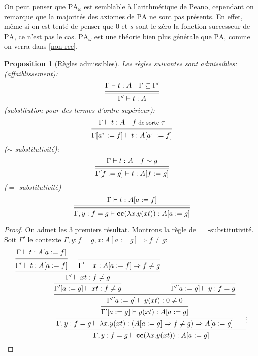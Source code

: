 \documentclass[a4paper,12pt]{article}
\newtheorem{prop}[theo]{Proposition}
\theoremstyle{rmqstyle}
\newcommand{\PA}{\mathrm{PA}}
\renewcommand{\implies}{\Rightarrow}
\newcommand{\cc}{\mathbf{cc}}
\begin{document}
On peut penser que $\PA_\omega$ est semblable à l'arithmétique de Peano, cependant on remarque que la majorités des axiomes de $\PA$ ne sont pas présents. En effet, même si on est tenté de penser que $0$ et $s$ sont le zéro la fonction successeur de $\PA$, ce n'est pas le cas. $\PA_\omega$ est une théorie bien plus générale que $\PA$, comme on verra dans \ref{non rec}. 

\begin{prop}[Règles admissibles]
Les règles suivantes sont admissibles:\\
(affaiblissement):
$$ 
\begin{prooftree}[center=false]
\hypo{\Gamma \vdash t : A \quad \Gamma \subseteq \Gamma'}
\infer[double]1{\Gamma' \vdash t : A}
\end{prooftree}
$$
(substitution pour des termes d'ordre supérieur):
$$
\begin{prooftree}[center=false]
\hypo{\Gamma \vdash t : A \quad {\footnotesize f \text{ de sorte } \tau}}
\infer[double]1{\Gamma[a^\tau := f] \vdash t : A[a^\tau := f]}
\end{prooftree}
$$
($\sim$-substitutivité):
$$
\begin{prooftree}[center=false]
\hypo{\Gamma \vdash t : A \quad f \sim g}
\infer[double]1{\Gamma[f := g] \vdash t : A[f := g]}
\end{prooftree}
$$
($=$-substitutivité)
$$
\begin{prooftree}[center=false]
\hypo{\Gamma \vdash t : A[a := f]}
\infer[double]1{\Gamma, y : f = g \vdash \cc(\lambda x. y(xt)) : A[a := g]}
\end{prooftree}
$$
\end{prop}

\begin{proof} 
On admet les 3 premiers résultat. Montrons la règle de $=$-substitutivité. Soit $\Gamma'$ le contexte $\Gamma, y : f = g, x : A[a := g] \implies f \neq g$:
$$
\begin{prooftree}[center=false]
\hypo{\Gamma \vdash t : A[a := f]}
\infer[double]1{\Gamma' \vdash t : A[a := f]}
\infer0{\Gamma' \vdash x : A[a := f] \implies f \neq g}
\infer2{\Gamma' \vdash xt : f \neq g}
\infer1{\Gamma'[a := g] \vdash xt : f \neq g}
\infer0{\Gamma'[a := g] \vdash y : f = g}
\infer2{\Gamma'[a := g] \vdash y(xt) : 0 \neq 0}
\infer1{\Gamma'[a := g] \vdash y(xt) : A[a := g]}
\infer1{\Gamma, y : f = g \vdash \lambda x. y(xt) : (A[a := g] \implies f \neq g) \implies A[a := g]}
\hypo{}
\ellipsis{}{}
\infer2{\Gamma, y : f = g \vdash \cc(\lambda x. y(xt)) : A[a := g]}
\end{prooftree}
$$
\end{proof}
\end{document}
